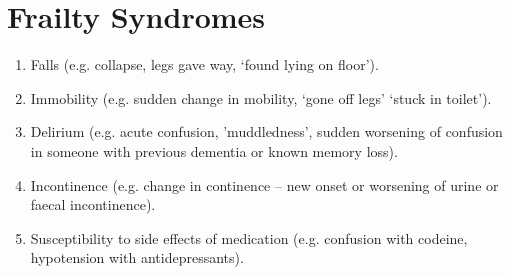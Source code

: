 \documentclass
[
	12pt,
	a4paper,
	oneside,
]{report}
\begin{document}
\chapter{Frailty Syndromes}
	\label{apx:syndromes}
	\begin{enumerate}
	\item Falls (e.g. collapse, legs gave way, ‘found lying on floor’).
	\item Immobility (e.g. sudden change in mobility, ‘gone off legs’ ‘stuck in toilet’).
	\item Delirium (e.g. acute confusion, ’muddledness’,
		sudden worsening of confusion in someone with
		previous dementia or known memory loss).
	\item Incontinence (e.g. change in continence –
		new onset or worsening of urine or faecal
		incontinence).
	\item Susceptibility to side effects of medication
		(e.g. confusion with codeine, hypotension with
		antidepressants).
	\end{enumerate}

	\parencite[page 8]{bgs:14}

\end{document}
